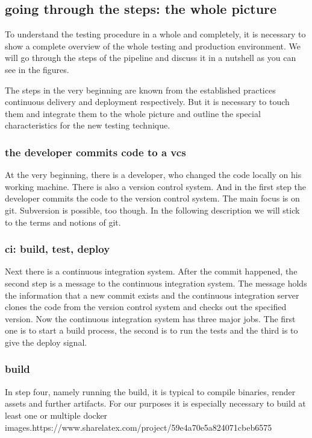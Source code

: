 \subsection{going through the steps: the whole picture}
To understand the testing procedure in a whole and completely, it is necessary to show a
complete overview of the whole testing and production environment. We will go through the
steps of the pipeline and discuss it in a nutshell as you can see in the figures.

The steps in the very beginning are known from the established practices continuous
delivery and deployment respectively. But it is necessary to touch them and integrate them
to the whole picture and outline the special characteristics for the new testing
technique.

\subsubsection{the developer commits code to a vcs}
At the very beginning, there is a developer, who changed the code locally on his working
machine. There is also a version control system. And in the first step the developer
commits the code to the version control system. The main focus is on git. Subversion is
possible, too though. In the following description we will stick to the terms and notions
of git.

\subsubsection{ci: build, test, deploy}
Next there is a continuous integration system. After the commit happened, the second step
is a message to the continuous integration system. The message holds the information that
a new commit exists and the continuous integration server clones the code from the version
control system and checks out the specified version. Now the continuous integration system
has three major jobs. The first one is to start a build process, the second is to run the
tests and the third is to give the deploy signal.

\subsubsection{build}
In step four, namely running the build, it is typical to compile binaries, render assets
and further artifacts. For our purposes it is especially necessary to build at least one
or multiple docker images.https://www.sharelatex.com/project/59e4a70e5a824071cbeb6575

